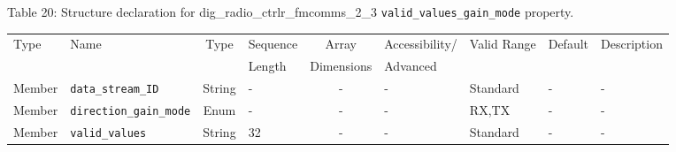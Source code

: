 \documentclass{article}
\def\comp{dig\_radio\_ctrlr\_fmcomms\_2\_3}
\begin{document}
\begin{landscape}
	\noindent Table \hypertarget{tab20}{20}: Structure declaration for \comp{} \verb+valid_values_gain_mode+ property.
	\begin{scriptsize}
		\noindent\begin{longtable}{|p{1.8cm}|p{3.6cm}|c|p{2cm}|c|p{2cm}|p{1.7cm}|p{0.8cm}|p{6.8cm}|}
			\hline
			\rowcolor{blue}
			Type         & Name                                & Type & Sequence & Array      & Accessibility/ & Valid Range  & Default & Description                                                                                                                                                                                                                       \\
			\rowcolor{blue}
			             &                                     &      & Length   & Dimensions & Advanced       &              &         &                                                                                                                                                                                                                             \\
			\hline
			Member       & \verb+data_stream_ID+               & String& -       & -          & -              & Standard     & -       & - \\
			\hline
			Member       & \verb+direction_gain_mode+          & Enum  & -       & -          & -              & RX,TX        & -       & - \\
			\hline
			Member       & \verb+valid_values+                 & String & 32      & -          & -              & Standard & -       & - \\
			\hline
		\end{longtable}
	\end{scriptsize}


\end{landscape}
\end{document}
